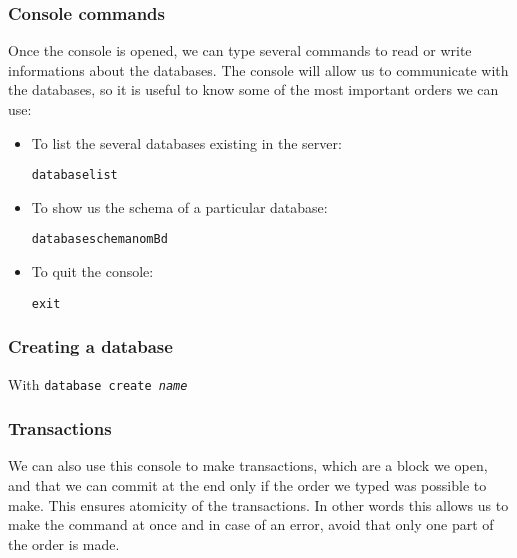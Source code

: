\documentclass{article}
\begin{document}
\subsubsection{Console commands}

Once the console is opened, we can type several commands to read or write informations about the databases. The console will allow us to communicate with the databases, so it is useful to know some of the most important orders we can use:

\begin{itemize}
\item To list the several databases existing in the server:    \begin{alltt}database list\end{alltt}       
\item To show us the schema of a particular database:    \begin{alltt}database schema nomBd\end{alltt}       
\item To quit the console:                        \begin{alltt}exit\end{alltt}  
\end{itemize}

\subsubsection{Creating a database}

With \texttt{database create \emph{name}}


  \subsubsection{Transactions}
We can also use this console to make transactions, which are a block we open, and that we can commit at the end only if the order we typed was possible to make. This ensures atomicity of the transactions. In other words this allows us to make the command at once and in case of an error, avoid that only one part of the order is made.
\end{document}
